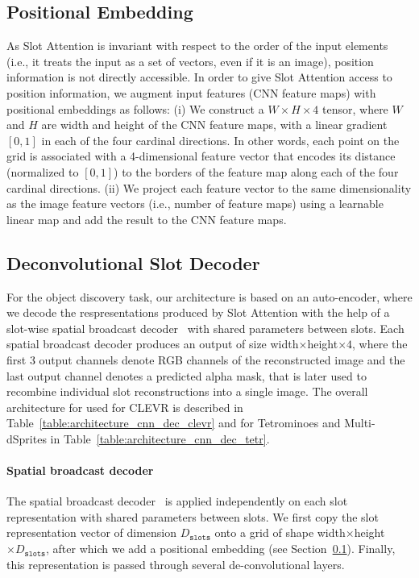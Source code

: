 \documentclass{article}
\newcommand{\slots}[0]{\texttt{slots}}
\newcommand{\sam}[0]{Slot Attention\xspace}
\begin{document}
\subsection{Positional Embedding}\label{app:pos_embedd}
As \sam is invariant with respect to the order of the input elements (i.e., it treats the input as a set of vectors, even if it is an image), position information is not directly accessible. In order to give \sam access to position information, we augment input features (CNN feature maps) with positional embeddings as follows: (i) We construct a $W\times H\times 4$ tensor, where $W$ and $H$ are width and height of the CNN feature maps, with a linear gradient $[0,1]$ in each of the four cardinal directions. In other words, each point on the grid is associated with a 4-dimensional feature vector that encodes its distance (normalized to $[0,1]$) to the borders of the feature map along each of the four cardinal directions. (ii) We project each feature vector to the same dimensionality as the image feature vectors (i.e., number of feature maps) using a learnable linear map and add the result to the CNN feature maps.

\subsection{Deconvolutional Slot Decoder}
\label{sec:app_slot_dec}
For the object discovery task, our architecture is based on an auto-encoder, where we decode the respresentations produced by Slot Attention with the help of a slot-wise spatial broadcast decoder~\citep{watters2019spatial} with shared parameters between slots. Each spatial broadcast decoder produces an output of size width$\times$height$\times4$, where the first 3 output channels denote RGB channels of the reconstructed image and the last output channel denotes a predicted alpha mask, that is later used to recombine individual slot reconstructions into a single image. The overall architecture for used for CLEVR is described in Table~\ref{table:architecture_cnn_dec_clevr} and for Tetrominoes and Multi-dSprites in Table~\ref{table:architecture_cnn_dec_tetr}.

\paragraph{Spatial broadcast decoder}
The spatial broadcast decoder~\citep{watters2019spatial} is applied independently on each slot representation with shared parameters between slots. We first copy the slot representation vector of dimension $D_{\slots}$ onto a grid of shape width$\times$height$\times D_{\slots}$, after which we add a positional embedding (see Section~\ref{app:pos_embedd}). Finally, this representation is passed through several de-convolutional layers.
\end{document}
